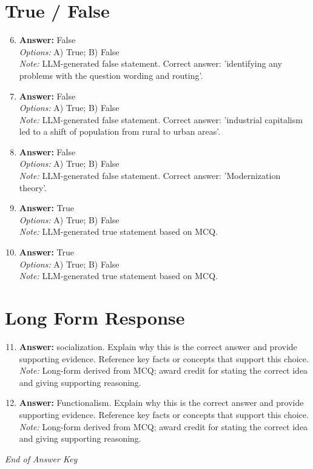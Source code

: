 \documentclass[12pt]{article}
\begin{document}
\section*{True / False}
\begin{enumerate}[label=\arabic*.]
\setcounter{enumi}{5}
\item \textbf{Answer:} False
\\ \textit{Options:} A) True; B) False
\\ \textit{Note:} LLM-generated false statement. Correct answer: 'identifying any problems with the question wording and routing'.
\item \textbf{Answer:} False
\\ \textit{Options:} A) True; B) False
\\ \textit{Note:} LLM-generated false statement. Correct answer: 'industrial capitalism led to a shift of population from rural to urban areas'.
\item \textbf{Answer:} False
\\ \textit{Options:} A) True; B) False
\\ \textit{Note:} LLM-generated false statement. Correct answer: 'Modernization theory'.
\item \textbf{Answer:} True
\\ \textit{Options:} A) True; B) False
\\ \textit{Note:} LLM-generated true statement based on MCQ.
\item \textbf{Answer:} True
\\ \textit{Options:} A) True; B) False
\\ \textit{Note:} LLM-generated true statement based on MCQ.
\end{enumerate}

\section*{Long Form Response}
\begin{enumerate}[label=\arabic*.]
\setcounter{enumi}{10}
\item \textbf{Answer:} socialization. Explain why this is the correct answer and provide supporting evidence. Reference key facts or concepts that support this choice.
\\ \textit{Note:} Long-form derived from MCQ; award credit for stating the correct idea and giving supporting reasoning.
\item \textbf{Answer:} Functionalism. Explain why this is the correct answer and provide supporting evidence. Reference key facts or concepts that support this choice.
\\ \textit{Note:} Long-form derived from MCQ; award credit for stating the correct idea and giving supporting reasoning.
\end{enumerate}

\vfill
\noindent\textit{End of Answer Key}
\end{document}

